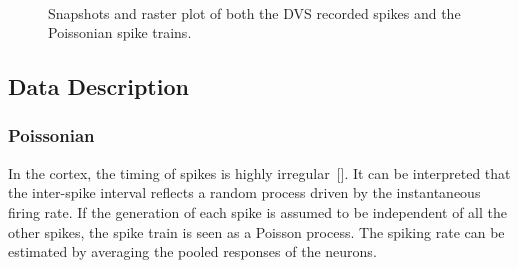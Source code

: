 \begin{figure}[hbt]
  \centering
  \\
  
  \caption{Snapshots and raster plot of both the DVS recorded spikes and the Poissonian spike trains.}
  \label{fig:zero}
\end{figure}

\subsection{Data Description}	
	\subsubsection{Poissonian}
	
	In the cortex, the timing of spikes is highly irregular~[\cite{squire1998findings}].
	It can be interpreted that the inter-spike interval reflects a random process driven by the instantaneous firing rate.
	If the generation of each spike is assumed to be independent of all the other spikes, the spike train is seen as a Poisson process.
	The spiking rate can be estimated by averaging the pooled responses of the neurons.
		

